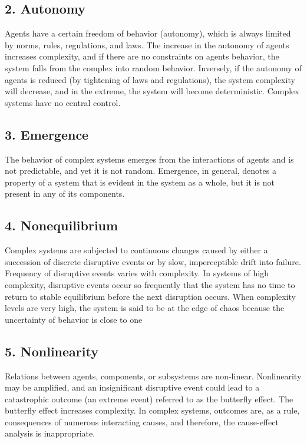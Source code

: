 \documentclass[]{article}
\begin{document}
\subsection{2. Autonomy}\label{autonomy}

Agents have a certain freedom of behavior (autonomy), which is always
limited by norms, rules, regulations, and laws. The increase in the
autonomy of agents increases complexity, and if there are no constraints
on agents behavior, the system falls from the complex into random
behavior. Inversely, if the autonomy of agents is reduced (by tightening
of laws and regulations), the system complexity will decrease, and in
the extreme, the system will become deterministic. Complex systems have
no central control.

\subsection{3. Emergence}\label{emergence}

The behavior of complex systems emerges from the interactions of agents
and is not predictable, and yet it is not random. Emergence, in general,
denotes a property of a system that is evident in the system as a whole,
but it is not present in any of its components.

\subsection{4. Nonequilibrium}\label{nonequilibrium}

Complex systems are subjected to continuous changes caused by either a
succession of discrete disruptive events or by slow, imperceptible drift
into failure. Frequency of disruptive events varies with complexity. In
systems of high complexity, disruptive events occur so frequently that
the system has no time to return to stable equilibrium before the next
disruption occurs. When complexity levels are very high, the system is
said to be at the edge of chaos because the uncertainty of behavior is
close to one

\subsection{5. Nonlinearity}\label{nonlinearity}

Relations between agents, components, or subsystems are non-linear.
Nonlinearity may be amplified, and an insignificant disruptive event
could lead to a catastrophic outcome (an extreme event) referred to as
the butterfly effect. The butterfly effect increases complexity. In
complex systems, outcomes are, as a rule, consequences of numerous
interacting causes, and therefore, the cause-effect analysis is
inappropriate.
\end{document}
